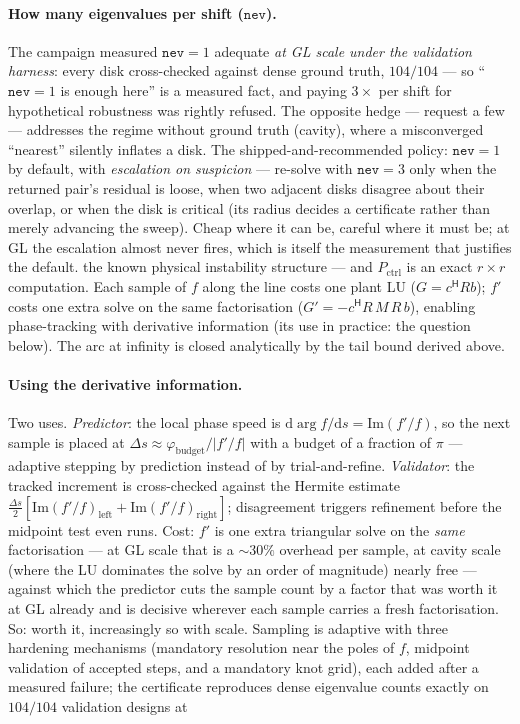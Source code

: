 \documentclass[11pt,a4paper]{article}
\newcommand{\code}[1]{\texttt{#1}}
\newcommand{\hp}{^{\mathsf H}}
\begin{document}
{\paragraph{How many eigenvalues per shift ($\code{nev}$).}
The campaign measured $\code{nev}=1$ adequate \emph{at GL scale under the
validation harness}: every disk cross-checked against dense ground truth, $104/104$ ---
so ``$\code{nev}=1$ is enough here'' is a measured fact, and paying $3\times$ per shift
for hypothetical robustness was rightly refused.  The opposite hedge --- request a few --- addresses the regime without ground truth
(cavity), where a misconverged ``nearest'' silently inflates a disk.
The shipped-and-recommended policy: $\code{nev}=1$ by default, with \emph{escalation on
suspicion} --- re-solve with $\code{nev}=3$ only when the returned pair's residual is
loose, when two adjacent disks disagree about their overlap, or when the disk is
critical (its radius decides a certificate rather than merely advancing the sweep).
Cheap where it can be, careful where it must be; at GL the escalation almost never
fires, which is itself the measurement that justifies the default.
the known physical instability structure --- and $P_{\mathrm{ctrl}}$ is an exact $r\times
r$ computation.  Each sample of $f$ along the line costs one plant LU
($G=c\hp Rb$); $f'$ costs one extra solve on the same factorisation
($G'=-c\hp R\,M\,R\,b$), enabling phase-tracking with derivative information (its use in
practice: the question below).  The arc at infinity is closed analytically by the tail
bound derived above.  
\paragraph{Using the derivative information.}
Two uses.  \emph{Predictor}: the local phase speed is
$\mathrm{d}\arg f/\mathrm{d}s=\mathrm{Im}(f'/f)$, so the next sample is placed at
$\Delta s\approx\varphi_{\mathrm{budget}}/|f'/f|$ with a budget of a fraction of $\pi$ ---
adaptive stepping by prediction instead of by trial-and-refine.  \emph{Validator}: the
tracked increment is cross-checked against the Hermite estimate
$\tfrac{\Delta s}2[\mathrm{Im}(f'/f)_{\mathrm{left}}+\mathrm{Im}(f'/f)_{\mathrm{right}}]$;
disagreement triggers refinement before the midpoint test even runs.  Cost: $f'$ is one
extra triangular solve on the \emph{same} factorisation --- at GL scale that is a
$\sim30\%$ overhead per sample, at cavity scale (where the LU dominates the solve by an
order of magnitude) nearly free --- against which the predictor cuts the sample count by
a factor that was worth it at GL already and is decisive wherever each sample carries a
fresh factorisation.  So: worth it, increasingly so with scale.
Sampling is adaptive with three hardening
mechanisms (mandatory resolution near the poles of $f$, midpoint validation of accepted
steps, and a mandatory knot grid), each added after a measured failure; the certificate
reproduces dense eigenvalue counts exactly on $104/104$ validation designs at

}
\end{document}
